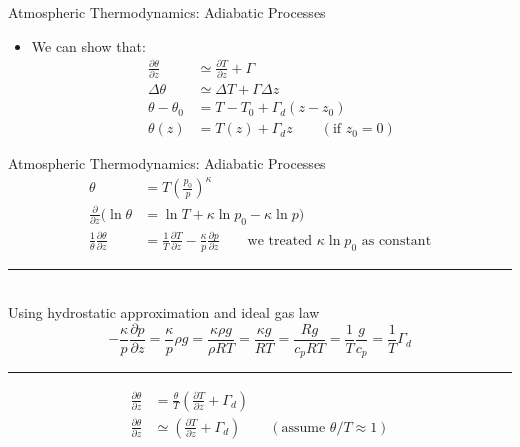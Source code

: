 \begin{frame}{Atmospheric Thermodynamics: Adiabatic Processes}
\begin{itemize}
\item We can show that:
\begin{align*}
\frac{\partial \theta}{\partial z} &\simeq \frac{\partial T}{\partial z} + \Gamma\\
\Delta \theta &\simeq \Delta T + \Gamma \Delta z\\
\theta-\theta_0 &= T-T_0 + \Gamma_d(z-z_0)\\
\theta(z) &= T(z) + \Gamma_d z \qquad (\text{if } z_0=0)
\end{align*}
\end{itemize}
\end{frame}


\begin{frame}{Atmospheric Thermodynamics: Adiabatic Processes}
\begin{align*}
	\theta &= T\left(\frac{p_0}{p}\right)^\kappa \\
\frac{\partial}{\partial z}(\ln \theta &= \ln{T} + \kappa \ln{p_0} - \kappa \ln{p})\\
\frac{1}{\theta} \frac{\partial \theta}{\partial z} &= \frac{1}{T}\frac{\partial T}{\partial z} - \frac{\kappa}{p}\frac{\partial p}{\partial z} \qquad \text{we treated } \kappa \ln{p_0} \text{ as constant}
\end{align*}
\hrule
~\\
Using hydrostatic approximation and ideal gas law
$$-\frac{\kappa}{p} \frac{\partial p}{\partial z} = \frac{\kappa}{p}\rho g = \frac{\kappa \rho g}{\rho RT} = \frac{\kappa g}{RT} = \frac{Rg}{c_p RT} = \frac{1}{T}\frac{g}{c_p} = \frac{1}{T}\Gamma_d$$
\hrule
\begin{align*}
	 \frac{\partial \theta}{\partial z} &= \frac{\theta}{T} \left(\frac{\partial T}{\partial z} + \Gamma_d\right)\\
	 \frac{\partial \theta}{\partial z} &\simeq \left(\frac{\partial T}{\partial z} + \Gamma_d\right) \qquad (\text{assume } \theta/T \approx 1)
\end{align*}

\end{frame}


